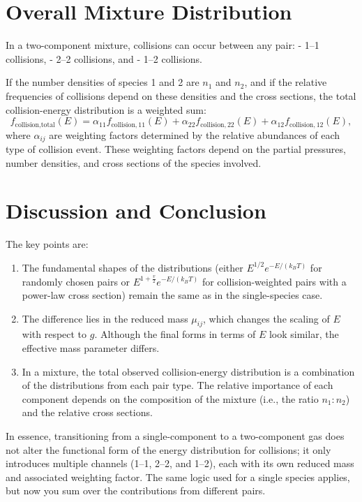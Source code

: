 \section{Overall Mixture Distribution}

In a two-component mixture, collisions can occur between any pair:
- 1–1 collisions,
- 2–2 collisions, and
- 1–2 collisions.

If the number densities of species 1 and 2 are \( n_1 \) and \( n_2 \), and if the relative frequencies of collisions depend on these densities and the cross sections, the total collision-energy distribution is a weighted sum:
\[
f_{\text{collision,total}}(E) = \alpha_{11} f_{\text{collision},11}(E) + \alpha_{22} f_{\text{collision},22}(E) + \alpha_{12} f_{\text{collision},12}(E),
\]
where \(\alpha_{ij}\) are weighting factors determined by the relative abundances of each type of collision event. These weighting factors depend on the partial pressures, number densities, and cross sections of the species involved.

\section{Discussion and Conclusion}

The key points are:
\begin{enumerate}
  \item The fundamental shapes of the distributions (either \( E^{1/2} e^{-E/(k_B T)} \) for randomly chosen pairs or \( E^{1+\frac{v}{2}} e^{-E/(k_B T)} \) for collision-weighted pairs with a power-law cross section) remain the same as in the single-species case.

  \item The difference lies in the reduced mass \(\mu_{ij}\), which changes the scaling of \( E \) with respect to \( g \). Although the final forms in terms of \( E \) look similar, the effective mass parameter differs.

  \item In a mixture, the total observed collision-energy distribution is a combination of the distributions from each pair type. The relative importance of each component depends on the composition of the mixture (i.e., the ratio \( n_1:n_2 \)) and the relative cross sections.
\end{enumerate}

In essence, transitioning from a single-component to a two-component gas does not alter the functional form of the energy distribution for collisions; it only introduces multiple channels (1–1, 2–2, and 1–2), each with its own reduced mass and associated weighting factor. The same logic used for a single species applies, but now you sum over the contributions from different pairs.



